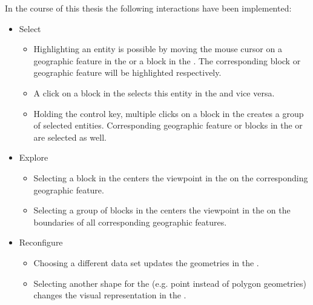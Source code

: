 In the course of this thesis the following interactions have been implemented:
\begin{itemize}
  \item
    Select

    \begin{itemize}
      \item
        Highlighting an entity is possible by moving the mouse cursor on a geographic feature in the \gv{} or a block in the \tmap{}.
        The corresponding block or geographic feature will be highlighted respectively.
      \item
        A click on a block in the \tmap{} selects this entity in the \gv{} and vice versa.
      \item
        Holding the control key, multiple clicks on a block in the \tmap{} creates a group of selected entities.
        Corresponding geographic feature or blocks in the \tmap{} or \gv{} are selected as well.
    \end{itemize}

  \item
    Explore

    \begin{itemize}
      \item Selecting a block in the \tmap{} centers the viewpoint in the \gv{} on the corresponding geographic feature.
      \item Selecting a group of blocks in the \tmap{} centers the viewpoint in the \gv{} on the boundaries of all corresponding geographic features.
    \end{itemize}

  \item
    Reconfigure

    \begin{itemize}
      \item
        Choosing a different data set updates the geometries in the \gv{}.
      \item
        Selecting another shape for the \tmap{} (e.g. point instead of polygon geometries) changes the visual representation in the \gv{}.
    \end{itemize}

\end{itemize}


